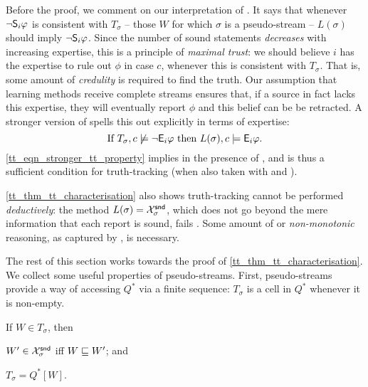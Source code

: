 Before the proof, we comment on our interpretation of
\credulity{}. It says that whenever $\neg\S_i\phi$
is consistent with $T_\sigma$ -- those $W$ for which $\sigma$ is a
pseudo-stream -- $L(\sigma)$ should imply $\neg\S_i\phi$. Since the number of
sound statements \emph{decreases} with increasing expertise, this is a
principle of \emph{maximal trust}: we should believe $i$ has the expertise to
rule out $\phi$ in case $c$, whenever this is consistent with $T_\sigma$.  That
is, some amount of \emph{credulity} is required to find the truth. Our
assumption that learning methods receive complete streams ensures that, if a
source in fact lacks this expertise, they will eventually report $\phi$ and
this belief can be be retracted.
%
A stronger version of \credulity{} spells this out
explicitly in terms of expertise:
\begin{equation}
    \label{tt_eqn_stronger_tt_property}
    \text{If }
    T_\sigma, c \not\models \neg\E_i\phi
    \text{ then }
    L(\sigma), c \models \E_i\phi.
\end{equation}
\cref{tt_eqn_stronger_tt_property} implies \credulity{}
in the presence of \soundness{}, and is thus a sufficient condition for
truth-tracking (when also taken with \equivalence{} and
\repetition{}).\footnotemark{}


\cref{tt_thm_tt_characterisation} also shows truth-tracking cannot be performed
\emph{deductively}: the method $L(\sigma) = \Xsnd_\sigma$, which does not go
beyond the mere information that each report is sound, fails
\credulity{}. Some amount of or \emph{non-monotonic} reasoning, as captured by
\credulity{}, is necessary.

The rest of this section works towards the proof of
\cref{tt_thm_tt_characterisation}. We collect some useful properties of
pseudo-streams. First, pseudo-streams provide a way of accessing $Q^*$ via a
finite sequence: $T_\sigma$ is a cell in $Q^*$ whenever it is non-empty.

\begin{lemma}
    \label{tt_lemma_tsigma_qstar}
    If $W \in T_\sigma$, then
    \begin{inlinelist}
        \item\label{tt_item_ps_upperset} $W' \in \Xsnd_\sigma$ iff $W \specleq
            W'$; and
        \item\label{tt_item_tsigma_qstar} $T_\sigma = Q^*[W]$.
    \end{inlinelist}
\end{lemma}

